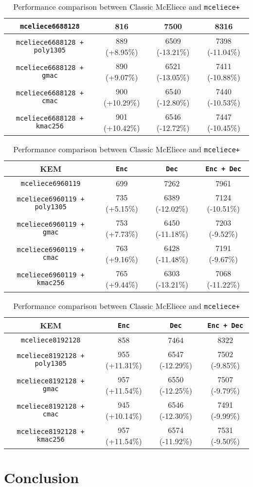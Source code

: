\documentclass[runningheads]{llncs}
\begin{document}
\begin{table}[h]
\begin{tabular}[c]{|c|c|c|c|}
        \hline
        \texttt{mceliece6688128} & 816 & 7500 & 8316 \\
        \hline
        \texttt{mceliece6688128 + poly1305} & 889 (+8.95\%) & 6509 (-13.21\%) & 7398 (-11.04\%) \\
        \hline
        \texttt{mceliece6688128 + gmac} & 890 (+9.07\%) & 6521 (-13.05\%) & 7411 (-10.88\%) \\
        \hline
        \texttt{mceliece6688128 + cmac} & 900 (+10.29\%) & 6540 (-12.80\%) & 7440 (-10.53\%) \\
        \hline
        \texttt{mceliece6688128 + kmac256} & 901 (+10.42\%) & 6546 (-12.72\%) & 7447 (-10.45\%) \\
        \hline
    \end{tabular}
    \begin{tabular}[c]{|c|c|c|c|}
        \hline
        KEM & \texttt{Enc} & \texttt{Dec} & \texttt{Enc + Dec} \\
        \hline
        \texttt{mceliece6960119} & 699 & 7262 & 7961 \\
        \hline
        \texttt{mceliece6960119 + poly1305} & 735 (+5.15\%) & 6389 (-12.02\%) & 7124 (-10.51\%) \\
        \hline
        \texttt{mceliece6960119 + gmac} & 753 (+7.73\%) & 6450 (-11.18\%) & 7203 (-9.52\%) \\
        \hline
        \texttt{mceliece6960119 + cmac} & 763 (+9.16\%) & 6428 (-11.48\%) & 7191 (-9.67\%) \\
        \hline
        \texttt{mceliece6960119 + kmac256} & 765 (+9.44\%) & 6303 (-13.21\%) & 7068 (-11.22\%) \\
        \hline
    \end{tabular}
    \begin{tabular}[c]{|c|c|c|c|}
        \hline
        KEM & \texttt{Enc} & \texttt{Dec} & \texttt{Enc + Dec} \\
        \hline
        \texttt{mceliece8192128} & 858 & 7464 & 8322 \\
        \hline
        \texttt{mceliece8192128 + poly1305} & 955 (+11.31\%) & 6547 (-12.29\%) & 7502 (-9.85\%) \\
        \hline
        \texttt{mceliece8192128 + gmac} & 957 (+11.54\%) & 6550 (-12.25\%) & 7507 (-9.79\%) \\
        \hline
        \texttt{mceliece8192128 + cmac} & 945 (+10.14\%) & 6546 (-12.30\%) & 7491 (-9.99\%) \\
        \hline
        \texttt{mceliece8192128 + kmac256} & 957 (+11.54\%) & 6574 (-11.92\%) & 7531 (-9.50\%) \\
        \hline
    \end{tabular}
    \caption{Performance comparison between Classic McEliece and \texttt{mceliece+}}\label{tbl:mceliece-plus-performance}
\end{table}

\section{Conclusion}



\end{document}
